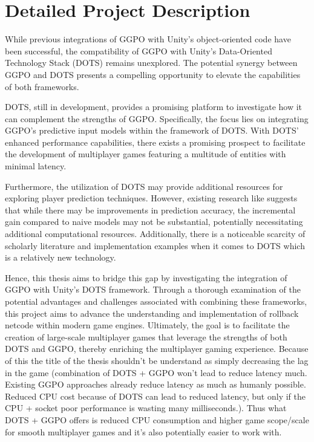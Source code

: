 \chapter{Detailed Project Description}

While previous integrations of GGPO with Unity's object-oriented code have been successful, the compatibility of GGPO with Unity's Data-Oriented Technology Stack (DOTS) remains unexplored. The potential synergy between GGPO and DOTS presents a compelling opportunity to elevate the capabilities of both frameworks.

DOTS, still in development, provides a promising platform to investigate how it can complement the strengths of GGPO. Specifically, the focus lies on integrating GGPO's predictive input models within the framework of DOTS. With DOTS' enhanced performance capabilities, there exists a promising prospect to facilitate the development of multiplayer games featuring a multitude of entities with minimal latency.

Furthermore, the utilization of DOTS may provide additional resources for exploring player prediction techniques. However, existing research like \cite{Improving_prediction} suggests that while there may be improvements in prediction accuracy, the incremental gain compared to naive models may not be substantial, potentially necessitating additional computational resources. Additionally, there is a noticeable scarcity of scholarly literature and implementation examples when it comes to DOTS which is a relatively new technology.

Hence, this thesis aims to bridge this gap by investigating the integration of GGPO with Unity's DOTS framework. Through a thorough examination of the potential advantages and challenges associated with combining these frameworks, this project aims to advance the understanding and implementation of rollback netcode within modern game engines. Ultimately, the goal is to facilitate the creation of large-scale multiplayer games that leverage the strengths of both DOTS and GGPO, thereby enriching the multiplayer gaming experience. Because of this the title of the thesis shouldn't be understand as simply decreasing the lag in the game (combination of DOTS + GGPO won't lead to reduce latency much. Existing GGPO approaches already reduce latency as much as humanly possible. Reduced CPU cost because of DOTS can lead to reduced latency, but only if the CPU + socket poor performance is wasting many milliseconds.). Thus what DOTS + GGPO offers is reduced CPU consumption and higher game scope/scale for smooth multiplayer games and it's also potentially easier to work with.

